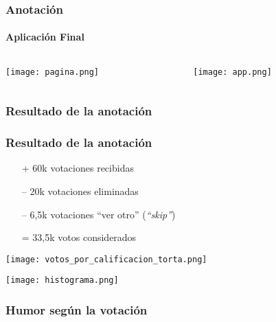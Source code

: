 \begin{frame}
\frametitle{Anotación}
\framesubtitle{Aplicación Final}
    \begin{center}
        \begin{columns}[c]
            \begin{column}[c]{0.45\textwidth}
                \centering
                \texttt{[image: pagina.png]}
            \end{column}

            \begin{column}[c]{0.45\textwidth}
                \centering
                \texttt{[image: app.png]}
            \end{column}
        \end{columns}
    \end{center}
\end{frame}

\subsubsection{Resultado de la anotación}
\begin{frame}[allowframebreaks]
    \frametitle{Resultado de la anotación}

    \begin{itemize}
        \item[+] 60k votaciones recibidas
        \item[--] 20k votaciones eliminadas
        \item[--] 6,5k votaciones “ver otro” (\emph{“skip”})
        \item[=] 33,5k votos considerados
    \end{itemize}

    \framebreak

    \begin{center}
        \texttt{[image: votos\_por\_calificacion\_torta.png]}

        \texttt{[image: histograma.png]}
    \end{center}
\end{frame}

\subsubsection{Humor según la votación}

